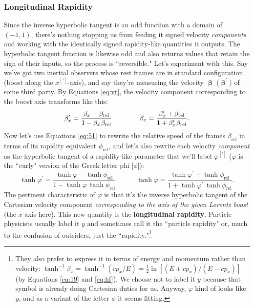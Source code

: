 \documentclass[12pt]{article}
\newcommand{\vvbeta}{\bm{\upbeta}}
\begin{document}
\subsubsection{Longitudinal Rapidity}

Since the inverse hyperbolic tangent is an odd function with a domain of $(-1, 1)$, there's nothing stopping us from feeding it signed velocity \emph{components} and working with the identically signed rapidity-like quantities it outputs. The hyperbolic tangent function is likewise odd and also returns values that retain the sign of their inputs, so the process is ``reversible." Let's experiment with this. Say we've got two inertial observers whose rest frames are in standard configuration (boost along the $x^{[\prime]}$-axis), and say they're measuring the velocity $\vvbeta$ ($\vvbeta^\prime$) of some third party. By Equations \ref{eq:vt}, the velocity component corresponding to the boost axis transforms like this:
\begin{equation*}
\beta_x^{\prime} = \frac{\beta_x - \beta_{\textrm{rel}}}{1 - \beta_{x} \mkern1mu \beta_{\textrm{rel}}} \qquad \qquad \beta_x = \frac{\beta_x^{\prime} + \beta_{\textrm{rel}}}{1 + \beta_x^{\prime} \mkern1mu \beta_{\textrm{rel}}}.
\end{equation*}
Now let's use Equations \ref{eq:51} to rewrite the relative speed of the frames $\beta_{\textrm{rel}}$ in terms of its rapidity equivalent $\phi_{\textrm{rel}}$, and let's also rewrite each velocity \emph{component} as the hyperbolic tangent of a rapidity-like parameter that we'll label $\varphi^{[\prime]}$ ($\varphi$ is the ``curly" version of the Greek letter phi [$\phi$]):
\begin{equation}\label{eq:th}
\tanh{\varphi^{\prime}} = \frac{\tanh{\varphi} - \tanh{\phi_{\textrm{rel}}}}{1 - \tanh{\varphi} \,  \tanh{\phi_{\textrm{rel}}}} \qquad \quad \tanh{\varphi} = \frac{\tanh{\varphi^{\prime}} + \tanh{\phi_{\textrm{rel}}}}{1 + \tanh{\varphi^{\prime}} \, \tanh{\phi_{\textrm{rel}}}} .
\end{equation}
The pertinent characteristic of $\varphi$ is that it's the inverse hyperbolic tangent of the Cartesian velocity component \emph{corresponding to the axis of the given Lorentz boost} (the $x$-axis here). This new quantity is the \textbf{longitudinal rapidity}. Particle physicists usually label it $y$ and sometimes call it the ``particle rapidity" or, much to the confusion of outsiders, just the ``rapidity."\footnote{They also prefer to express it in terms of energy and momentum rather than velocity: $\tanh^{-1}{\beta_x} = \tanh^{-1}{(cp_x / E)} = \frac{1}{2} \ln{[(E + cp_x) / (E - cp_x) ]}$ (by Equations \ref{eq:19} and \ref{eq:hf}). We choose not to label it $y$ because that symbol is already doing Cartesian duties for us. Anyway, $\varphi$ kind of looks like $y$, and as a variant of the letter $\phi$ it seems fitting.}
\end{document}
